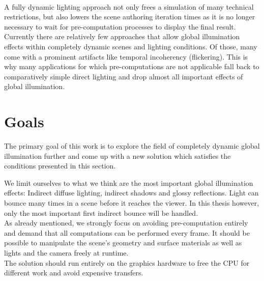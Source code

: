 \documentclass[thesis.tex]{subfiles}
\begin{document}
\\
A fully dynamic lighting approach not only frees a simulation of many technical restrictions, but also lowers the scene authoring iteration times as it is no longer necessary to wait for pre-computation processes to display the final result.
Currently there are relatively few approaches that allow global illumination effects within completely dynamic scenes and lighting conditions.
Of those, many come with a prominent artifacts like temporal incoherency (flickering).
This is why many applications for which pre-computations are not applicable fall back to comparatively simple direct lighting and drop almost all important effects of global illumination.

\section{Goals} \label{bib:goals}
The primary goal of this work is to explore the field of completely dynamic global illumination further and come up with a new solution which satisfies the conditions presented in this section.

We limit ourselves to what we think are the most important global illumination effects: Indirect diffuse lighting, indirect shadows and glossy reflections.
Light can bounce many times in a scene before it reaches the viewer.
In this thesis however, only the most important first indirect bounce will be handled.
\\
As already mentioned, we strongly focus on avoiding pre-computation entirely and demand that all computations can be performed every frame.
It should be possible to manipulate the scene's geometry and surface materials as well as lights and the camera freely at runtime.
\\
The solution should run entirely on the graphics hardware to free the CPU for different work and avoid expensive transfers.
\end{document}

